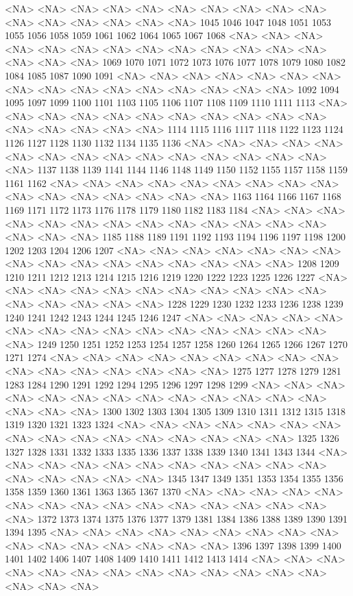 \documentclass{article}
\begin{document}
\begin{Schunk}
\begin{Soutput}
<NA> <NA> <NA> <NA> <NA> <NA> <NA> <NA> <NA> <NA> <NA> <NA> <NA> <NA> <NA> <NA> 
1045 1046 1047 1048 1051 1053 1055 1056 1058 1059 1061 1062 1064 1065 1067 1068 
<NA> <NA> <NA> <NA> <NA> <NA> <NA> <NA> <NA> <NA> <NA> <NA> <NA> <NA> <NA> <NA> 
1069 1070 1071 1072 1073 1076 1077 1078 1079 1080 1082 1084 1085 1087 1090 1091 
<NA> <NA> <NA> <NA> <NA> <NA> <NA> <NA> <NA> <NA> <NA> <NA> <NA> <NA> <NA> <NA> 
1092 1094 1095 1097 1099 1100 1101 1103 1105 1106 1107 1108 1109 1110 1111 1113 
<NA> <NA> <NA> <NA> <NA> <NA> <NA> <NA> <NA> <NA> <NA> <NA> <NA> <NA> <NA> <NA> 
1114 1115 1116 1117 1118 1122 1123 1124 1126 1127 1128 1130 1132 1134 1135 1136 
<NA> <NA> <NA> <NA> <NA> <NA> <NA> <NA> <NA> <NA> <NA> <NA> <NA> <NA> <NA> <NA> 
1137 1138 1139 1141 1144 1146 1148 1149 1150 1152 1155 1157 1158 1159 1161 1162 
<NA> <NA> <NA> <NA> <NA> <NA> <NA> <NA> <NA> <NA> <NA> <NA> <NA> <NA> <NA> <NA> 
1163 1164 1166 1167 1168 1169 1171 1172 1173 1176 1178 1179 1180 1182 1183 1184 
<NA> <NA> <NA> <NA> <NA> <NA> <NA> <NA> <NA> <NA> <NA> <NA> <NA> <NA> <NA> <NA> 
1185 1188 1189 1191 1192 1193 1194 1196 1197 1198 1200 1202 1203 1204 1206 1207 
<NA> <NA> <NA> <NA> <NA> <NA> <NA> <NA> <NA> <NA> <NA> <NA> <NA> <NA> <NA> <NA> 
1208 1209 1210 1211 1212 1213 1214 1215 1216 1219 1220 1222 1223 1225 1226 1227 
<NA> <NA> <NA> <NA> <NA> <NA> <NA> <NA> <NA> <NA> <NA> <NA> <NA> <NA> <NA> <NA> 
1228 1229 1230 1232 1233 1236 1238 1239 1240 1241 1242 1243 1244 1245 1246 1247 
<NA> <NA> <NA> <NA> <NA> <NA> <NA> <NA> <NA> <NA> <NA> <NA> <NA> <NA> <NA> <NA> 
1249 1250 1251 1252 1253 1254 1257 1258 1260 1264 1265 1266 1267 1270 1271 1274 
<NA> <NA> <NA> <NA> <NA> <NA> <NA> <NA> <NA> <NA> <NA> <NA> <NA> <NA> <NA> <NA> 
1275 1277 1278 1279 1281 1283 1284 1290 1291 1292 1294 1295 1296 1297 1298 1299 
<NA> <NA> <NA> <NA> <NA> <NA> <NA> <NA> <NA> <NA> <NA> <NA> <NA> <NA> <NA> <NA> 
1300 1302 1303 1304 1305 1309 1310 1311 1312 1315 1318 1319 1320 1321 1323 1324 
<NA> <NA> <NA> <NA> <NA> <NA> <NA> <NA> <NA> <NA> <NA> <NA> <NA> <NA> <NA> <NA> 
1325 1326 1327 1328 1331 1332 1333 1335 1336 1337 1338 1339 1340 1341 1343 1344 
<NA> <NA> <NA> <NA> <NA> <NA> <NA> <NA> <NA> <NA> <NA> <NA> <NA> <NA> <NA> <NA> 
1345 1347 1349 1351 1353 1354 1355 1356 1358 1359 1360 1361 1363 1365 1367 1370 
<NA> <NA> <NA> <NA> <NA> <NA> <NA> <NA> <NA> <NA> <NA> <NA> <NA> <NA> <NA> <NA> 
1372 1373 1374 1375 1376 1377 1379 1381 1384 1386 1388 1389 1390 1391 1394 1395 
<NA> <NA> <NA> <NA> <NA> <NA> <NA> <NA> <NA> <NA> <NA> <NA> <NA> <NA> <NA> <NA> 
1396 1397 1398 1399 1400 1401 1402 1406 1407 1408 1409 1410 1411 1412 1413 1414 
<NA> <NA> <NA> <NA> <NA> <NA> <NA> <NA> <NA> <NA> <NA> <NA> <NA> <NA> <NA> <NA> 

\end{Soutput}
\end{Schunk}
\end{document}
